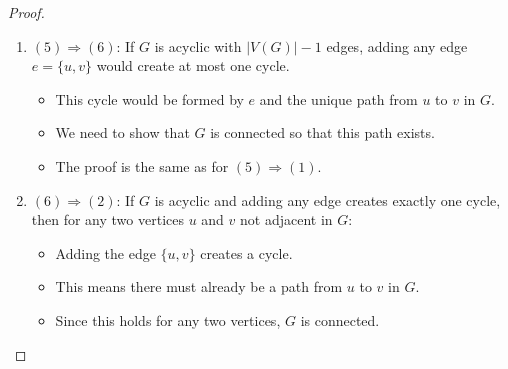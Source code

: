 \documentclass{article}
\theoremstyle{definition}
\begin{document}
\begin{proof}
\begin{enumerate}
    \item $(5) \Rightarrow (6)$: If $G$ is acyclic with $|V(G)| - 1$ edges, adding any edge $e = \{u,v\}$ would create at most one cycle.
    \begin{itemize}
        \item This cycle would be formed by $e$ and the unique path from $u$ to $v$ in $G$.
        \item We need to show that $G$ is connected so that this path exists.
        \item The proof is the same as for $(5) \Rightarrow (1)$.
    \end{itemize}
    
    \item $(6) \Rightarrow (2)$: If $G$ is acyclic and adding any edge creates exactly one cycle, then for any two vertices $u$ and $v$ not adjacent in $G$:
    \begin{itemize}
        \item Adding the edge $\{u,v\}$ creates a cycle.
        \item This means there must already be a path from $u$ to $v$ in $G$.
        \item Since this holds for any two vertices, $G$ is connected.
    \end{itemize}
\end{enumerate}
\end{proof}
\end{document}
